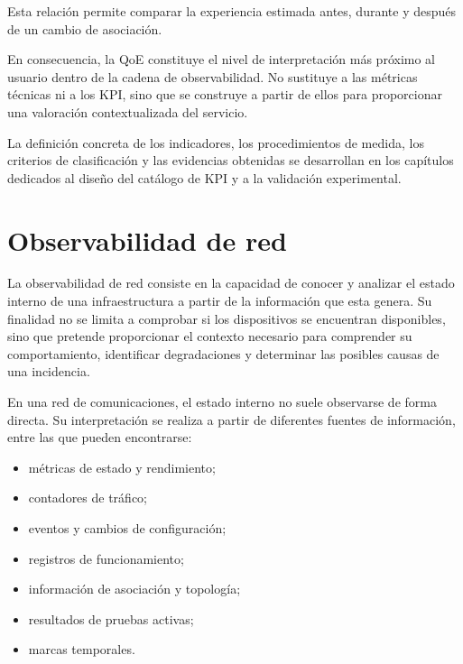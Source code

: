 Esta relación permite comparar la experiencia estimada antes, durante y
después de un cambio de asociación.

En consecuencia, la QoE constituye el nivel de interpretación más
próximo al usuario dentro de la cadena de observabilidad. No sustituye a
las métricas técnicas ni a los KPI, sino que se construye a partir de
ellos para proporcionar una valoración contextualizada del servicio.

La definición concreta de los indicadores, los procedimientos de medida,
los criterios de clasificación y las evidencias obtenidas se desarrollan
en los capítulos dedicados al diseño del catálogo de KPI y a la
validación experimental.

\section{Observabilidad de red}
\label{sec:observabilidad-red}

La observabilidad de red consiste en la capacidad de conocer y analizar
el estado interno de una infraestructura a partir de la información que
esta genera. Su finalidad no se limita a comprobar si los dispositivos
se encuentran disponibles, sino que pretende proporcionar el contexto
necesario para comprender su comportamiento, identificar degradaciones y
determinar las posibles causas de una incidencia.

En una red de comunicaciones, el estado interno no suele observarse de
forma directa. Su interpretación se realiza a partir de diferentes
fuentes de información, entre las que pueden encontrarse:

\begin{itemize}
    \item métricas de estado y rendimiento;

    \item contadores de tráfico;

    \item eventos y cambios de configuración;

    \item registros de funcionamiento;

    \item información de asociación y topología;

    \item resultados de pruebas activas;

    \item marcas temporales.
\end{itemize}

